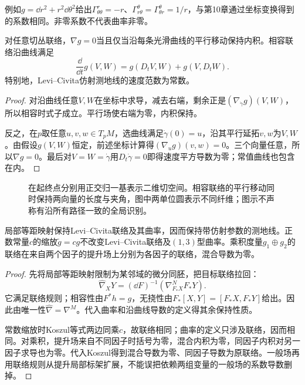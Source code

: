 例如$g=\dd r^2+r^2\dd\theta^2$给出$\Gamma^r_{\theta\theta}=-r$、$\Gamma^\theta_{r\theta}=\Gamma^\theta_{\theta r}=1/r$，与第10章通过坐标变换得到的系数相同。非零系数不代表曲率非零。

\begin{proposition}[相容性与等距平行移动]\label{prop:metric-transport}
对任意切丛联络，$\nabla g=0$当且仅当沿每条光滑曲线的平行移动保持内积。相容联络沿曲线满足
\[
 \frac{\dd}{\dd t}g(V,W)=g(D_tV,W)+g(V,D_tW).
\]
特别地，Levi--Civita仿射测地线的速度范数为常数。
\end{proposition}
\begin{proof}
对沿曲线任意$V,W$在坐标中求导，减去右端，剩余正是$(\nabla_{\dot\gamma}g)(V,W)$，所以相容时式子成立。平行场使右端为零，内积保持。

反之，在$p$取任意$u,v,w\in T_pM$，选曲线满足$\dot\gamma(0)=u$，沿其平行延拓$v,w$为$V,W$。由假设$g(V,W)$恒定，前述坐标计算得$(\nabla_u g)(v,w)=0$。三个向量任意，所以$\nabla g=0$。最后对$V=W=\dot\gamma$用$D_t\dot\gamma=0$即得速度平方导数为零；常值曲线也包含在内。
\end{proof}

\begin{figure}[htbp]
\centering
\caption{在起终点分别用正交归一基表示二维切空间。相容联络的平行移动同时保持两向量的长度与夹角，图中两单位圆表示不同纤维；图示不声称有沿所有路径一致的全局识别。}
\label{fig:metric-transport}
\end{figure}

\begin{proposition}\label{prop:metric-naturality}
局部等距映射保持Levi--Civita联络及其曲率，因而保持带仿射参数的测地线。正数常量$c$的缩放$\widetilde g=cg$不改变Levi--Civita联络及$(1,3)$型曲率。乘积度量$g_1\oplus g_2$的联络在来自两个因子的提升场上分别为各因子的联络，混合导数为零。
\end{proposition}
\begin{proof}
先将局部等距映射限制为某邻域的微分同胚，把目标联络拉回：
\[
 \widehat\nabla_XY=(\dd F)^{-1}(\nabla^N_{F_*X}F_*Y).
\]
它满足联络规则；相容性由$F^*h=g$，无挠性由$F_*[X,Y]=[F_*X,F_*Y]$给出。因此由唯一性$\widehat\nabla=\nabla^M$。代入曲率和沿曲线导数的定义得其余保持性质。

常数缩放时Koszul等式两边同乘$c$，故联络相同；曲率的定义只涉及联络，因而相同。对乘积，提升场来自不同因子时括号为零，混合内积为零，同因子内积对另一因子求导也为零。代入Koszul得到混合导数为零、同因子导数为原联络。一般场再用联络规则从提升局部标架扩展，不能误把依赖两组变量的一般场的系数导数删掉。
\end{proof}

